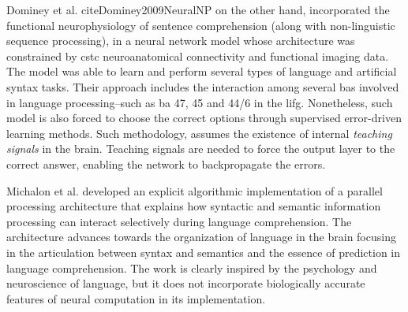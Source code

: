 {Dominey et al. cite{Dominey2009NeuralNP} on the other hand, incorporated the functional neurophysiology of sentence comprehension (along with non-linguistic sequence processing), in a neural network model whose architecture was constrained by \gls{cstc} neuroanatomical connectivity and functional imaging data. The model was able to learn and perform several types of language and artificial syntax tasks. Their approach includes the interaction among several \glspl{ba} involved in language processing--such as \gls{ba} 47, 45 and 44/6 in the \gls{lifg}. Nonetheless, such model is also forced to choose the correct options through supervised error-driven learning methods. Such methodology, assumes the existence of internal \emph{teaching signals} in the brain. Teaching signals are needed to force the output layer to the correct answer, enabling the network to backpropagate the errors.

Michalon et al. \cite{michalon_meaning-driven_2019} developed an explicit algorithmic implementation of a parallel processing architecture that explains how syntactic and semantic information processing can interact selectively during language comprehension. The architecture advances towards the organization of language in the brain focusing in the articulation between syntax and semantics and the essence of prediction in language comprehension. The work is clearly inspired by the psychology and neuroscience of language, but it does not incorporate biologically accurate features of neural computation in its implementation.

}
